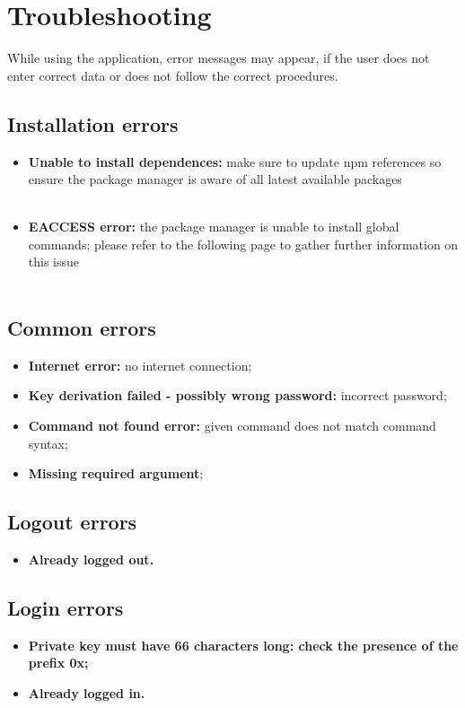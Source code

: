 \section{Troubleshooting}
While using the application, error messages may appear, if the user does not enter correct data or does not follow the correct procedures.
\subsection{Installation errors}
\begin{itemize}
	\item \textbf{Unable to install dependences:} make sure to update npm references so ensure the package manager is aware of all latest available packages\\\\ \centerline{}
	\item \textbf{EACCESS error:} the package manager is unable to install global commands; please refer to the following page to gather further information on this issue\\\\\centerline{}
\end{itemize}
\subsection{Common errors}
\begin{itemize}
	\item \textbf{Internet error:} no internet connection;
	\item \textbf{Key derivation failed - possibly wrong password:} incorrect password;
	\item \textbf{Command not found error:} given command does not match command syntax;
	\item \textbf{Missing required argument};
\end{itemize}
\subsection{Logout errors}
\begin{itemize}
	\item \textbf{Already logged out.}
\end{itemize}
\subsection{Login errors}
\begin{itemize}
	\item \textbf{Private key must have 66 characters long: check the presence of the prefix 0x;}
	\item \textbf{Already logged in.}
\end{itemize}
